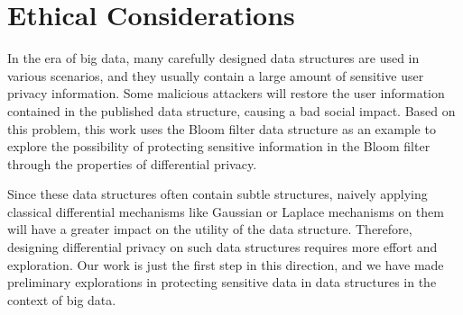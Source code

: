 \section*{Ethical Considerations}

In the era of big data, many carefully designed data structures are used in various scenarios, and they usually contain a large amount of sensitive user privacy information. 
Some malicious attackers will restore the user information contained in the published data structure, causing a bad social impact. 
Based on this problem, this work uses the Bloom filter data structure as an example to explore the possibility of protecting sensitive information in the Bloom filter through the properties of differential privacy.

Since these data structures often contain subtle structures, naively applying classical differential mechanisms like Gaussian or Laplace mechanisms on them will have a greater impact on the utility of the data structure.
Therefore, designing differential privacy on such data structures requires more effort and exploration. Our work is just the first step in this direction, and we have made preliminary explorations in protecting sensitive data in data structures in the context of big data.


